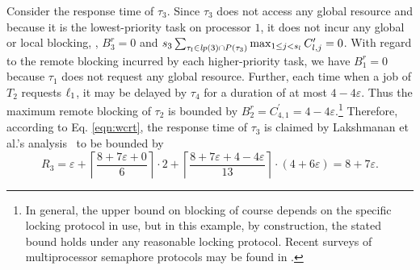 Consider the response time of $\tau_3$. Since $\tau_3$ does not access any global resource and because it is the lowest-priority task on processor $1$, it does not incur any global or local blocking, \ie, $B_3^r = 0$ and $s_3 \sum_{\tau_l \in \mathit{lp}(3) \cap P(\tau_3)} \max_{1 \leq j < s_l} C_{l,j}^{\prime} = 0$. With regard to the remote blocking incurred by each higher-priority task, we have $B_1^r = 0$ because $\tau_1$ does not request any global resource. Further, each time when a job of $T_2$ requests $\ell_1$, it may be delayed by $\tau_4$ for a duration of at most $4-4\varepsilon$. Thus the maximum remote blocking of $\tau_2$ is bounded by $B_2^r = C_{4,1}^{\prime} = 4-4\varepsilon$.\footnote{In general, the upper bound on blocking of course depends on the specific locking protocol in use, but in this example, by construction, the stated bound holds under any reasonable locking protocol. Recent surveys of multiprocessor semaphore protocols may be found in \cite{bbb-2013,yang-2015}.} Therefore, according to Eq. \eqref{eqn:wcrt}, the response time of $\tau_3$ is claimed by  Lakshmanan et al.'s analysis~\cite{lakshmanan-2009} to be bounded by
\begin{equation*}
R_3 = \varepsilon + \left \lceil \frac{8+7\varepsilon + 0}{6} \right \rceil \cdot 2 + \left \lceil \frac{8+7\varepsilon + 4-4\varepsilon}{13} \right \rceil \cdot (4+6\varepsilon) = 8+7\varepsilon.
\end{equation*}

